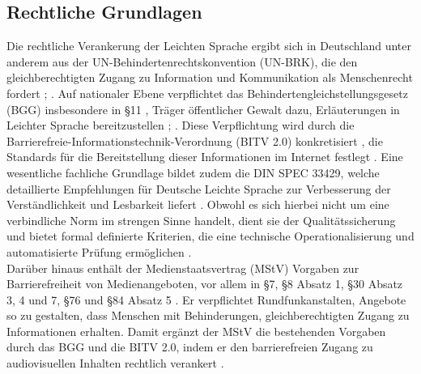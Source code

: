 \subsection{Rechtliche Grundlagen} \label{ch:rechtliche_grundlagen}
Die rechtliche Verankerung der Leichten Sprache ergibt sich in Deutschland unter anderem aus der UN-Behindertenrechtskonvention (UN-BRK), die den gleichberechtigten Zugang zu Information und Kommunikation als Menschenrecht fordert \cite[S. 80-81]{maas_handbuch_2018}; \cite{DINSPEC334292019}.
Auf nationaler Ebene verpflichtet das Behindertengleichstellungsgesetz (BGG) insbesondere in §11 \cite{bgg_par11}, Träger öffentlicher Gewalt dazu, Erläuterungen in Leichter Sprache bereitzustellen \cite[S. 82-83]{maas_handbuch_2018}; \cite[S. 643]{maas_handbuch_2018}.
Diese Verpflichtung wird durch die Barrierefreie-Informationstechnik-Verordnung (BITV 2.0) konkretisiert \cite{BITV2.0_2011}, die Standards für die Bereitstellung dieser Informationen im Internet festlegt \cite[S. 83-86]{maas_handbuch_2018}.
Eine wesentliche fachliche Grundlage bildet zudem die DIN SPEC 33429, welche detaillierte Empfehlungen für Deutsche Leichte Sprache zur Verbesserung der Verständlichkeit und Lesbarkeit liefert \cite{DINSPEC334292019}.
Obwohl es sich hierbei nicht um eine verbindliche Norm im strengen Sinne handelt, dient sie der Qualitätssicherung und bietet formal definierte Kriterien, die eine technische Operationalisierung und automatisierte Prüfung ermöglichen \cite{DINSPEC334292019}.\\
Darüber hinaus enthält der Medienstaatsvertrag (MStV) Vorgaben zur Barrierefreiheit von Medienangeboten, vor allem in §7, §8 Absatz 1, §30 Absatz 3, 4 und 7, §76 und §84 Absatz 5 \cite{bundesfachstelle_barrierefreiheit}.
Er verpflichtet Rundfunkanstalten, Angebote so zu gestalten, dass Menschen mit Behinderungen, gleichberechtigten Zugang zu Informationen erhalten.
Damit ergänzt der MStV die bestehenden Vorgaben durch das BGG und die BITV 2.0, indem er den barrierefreien Zugang zu audiovisuellen Inhalten rechtlich verankert \cite{mstv}.

